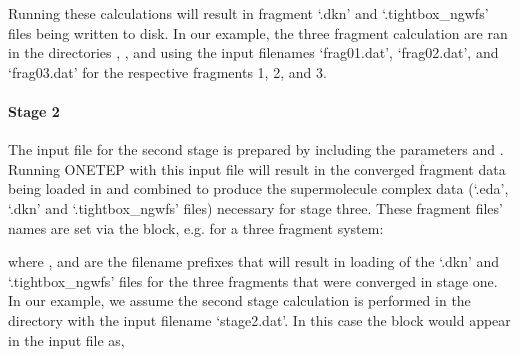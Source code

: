 \documentclass[letterpaper,10pt,english]{sphinxmanual}
\begin{document}
%
\begin{sphinxVerbatim}[commandchars=\\\{\}]
 
 
 
\end{sphinxVerbatim}

Running these calculations will result in fragment ‘.dkn’ and
‘.tightbox\_ngwfs’ files being written to disk. In our example, the
three fragment calculation are ran in the directories
, , and  using the
input filenames ‘frag01.dat’, ‘frag02.dat’, and ‘frag03.dat’ for the
respective fragments 1, 2, and 3.


\paragraph{Stage 2}
\label{\detokenize{EDA:stage-2}}
The input file for the second stage is prepared by including the
parameters  and . Running ONETEP
with this input file will result in the converged fragment data being
loaded in and combined to produce the supermolecule complex data
(‘.eda’, ‘.dkn’ and ‘.tightbox\_ngwfs’ files) necessary for stage three.
These fragment files’ names are set via the  block, e.g. for
a three fragment system:

%
\begin{sphinxVerbatim}[commandchars=\\\{\}]
 
 
\end{sphinxVerbatim}

where ,  and  are the
filename prefixes that will result in loading of the ‘.dkn’ and
‘.tightbox\_ngwfs’ files for the three fragments that were converged in
stage one. In our example, we assume the second stage calculation is
performed in the directory  with the input filename
‘stage2.dat’. In this case the block would appear in the input file as,

%
\begin{sphinxVerbatim}[commandchars=\\\{\}]
 
 
\end{sphinxVerbatim}
\end{document}
